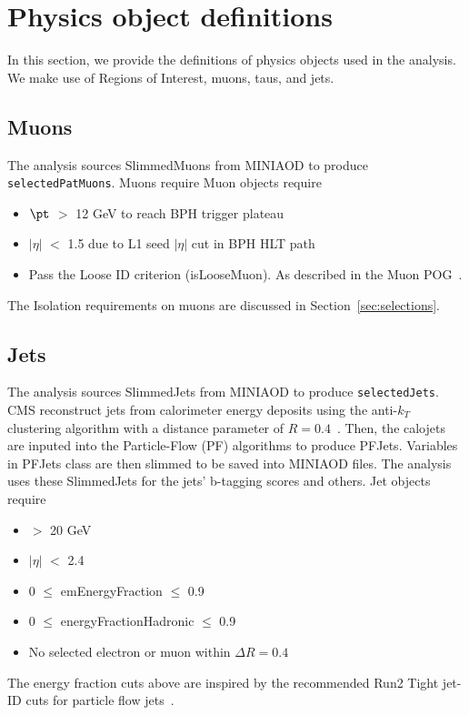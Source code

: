 \clearpage
\section{Physics object definitions}\label{sec:objects}

In this section, we provide the definitions of physics objects used in the analysis.
We make use of Regions of Interest, muons, taus, and jets.

\subsection{Muons}\label{sec:muons}


The analysis sources SlimmedMuons from MINIAOD to produce {\tt selectedPatMuons}.
Muons require 
Muon objects require 
\begin{itemize}
  \item $\pt$ $>$ 12 GeV to reach BPH trigger plateau
  \item $|\eta|$ $<$ 1.5 due to L1 seed $|\eta|$ cut in BPH HLT path
  \item Pass the Loose ID criterion (isLooseMuon). As described in the Muon POG~\cite{muonpog}.
\end{itemize}


The Isolation requirements on muons are discussed in Section~\ref{sec:selections}.


\subsection{Jets}\label{sec:jets}

The analysis sources SlimmedJets from MINIAOD to produce {\tt selectedJets}.
CMS reconstruct jets from calorimeter energy deposits using the
anti-$k_T$ clustering algorithm with a distance parameter of $R=0.4$~\cite{Cacciari:2008gp}.
Then, the calojets are inputed into the Particle-Flow (PF) algorithms to produce PFJets. Variables in PFJets class are then slimmed to be saved into MINIAOD files. The analysis uses these SlimmedJets for the jets' b-tagging scores and others.
Jet objects require
\begin{itemize}
  \item \pt $>$ 20 GeV
  \item $|\eta|$ $<$ 2.4
  \item 0 $\leq$ emEnergyFraction $\leq$ 0.9
  \item 0 $\leq$ energyFractionHadronic $\leq$ 0.9
  \item No selected electron or muon within $\Delta R=0.4$
\end{itemize}
The energy fraction cuts above are inspired by the recommended Run2 Tight jet-ID
cuts for particle flow jets~\cite{jetid_2016,jetid_2017,jetid_2018}.

